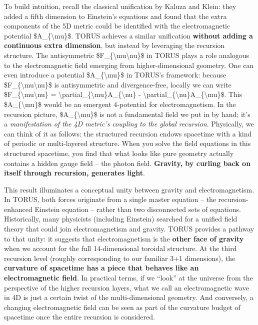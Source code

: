 \documentclass[
]{article}
\begin{document}
{To build intuition, recall the classical unification by Kaluza and
Klein: they added a fifth dimension to Einstein's equations and found
that the extra components of the 5D metric could be identified with the
electromagnetic potential \$A\_\{\textbackslash mu\}\$. TORUS achieves a
similar unification \textbf{without adding a continuous extra
dimension}, but instead by leveraging the recursion structure. The
antisymmetric \$F\_\{\textbackslash mu\textbackslash nu\}\$ in TORUS
plays a role analogous to the electromagnetic field emerging from
higher-dimensional geometry\hspace{0pt}. One can even introduce a
potential \$A\_\{\textbackslash mu\}\$ in TORUS's framework: because
\$F\_\{\textbackslash mu\textbackslash nu\}\$ is antisymmetric and
divergence-free, locally we can write
\$F\_\{\textbackslash mu\textbackslash nu\} =
\textbackslash partial\_\{\textbackslash mu\}A\_\{\textbackslash nu\} -
\textbackslash partial\_\{\textbackslash nu\}A\_\{\textbackslash mu\}\$\hspace{0pt}.
This \$A\_\{\textbackslash mu\}\$ would be an emergent 4-potential for
electromagnetism. In the recursion picture, \$A\_\{\textbackslash mu\}\$
is not a fundamental field we put in by hand; it's a \emph{manifestation
of the 4D metric's coupling to the global recursion}. Physically, we can
think of it as follows: the structured recursion endows spacetime with a
kind of periodic or multi-layered structure. When you solve the field
equations in this structured spacetime, you find that what looks like
pure geometry actually contains a hidden gauge field -- the photon
field. \textbf{Gravity, by curling back on itself through recursion,
generates light}.

This result illuminates a conceptual unity between gravity and
electromagnetism. In TORUS, both forces originate from a single master
equation -- the recursion-enhanced Einstein equation -- rather than two
disconnected sets of equations. Historically, many physicists (including
Einstein) searched for a unified field theory that could join
electromagnetism and gravity. TORUS provides a pathway to that unity: it
suggests that electromagnetism is the \textbf{other face of gravity}
when we account for the full 14-dimensional toroidal structure. At the
third recursion level (roughly corresponding to our familiar 3+1
dimensions), the \textbf{curvature of spacetime has a piece that behaves
like an electromagnetic field}\hspace{0pt}. In practical terms, if we
``look'' at the universe from the perspective of the higher recursion
layers, what we call an electromagnetic wave in 4D is just a certain
twist of the multi-dimensional geometry. And conversely, a changing
electromagnetic field can be seen as part of the curvature budget of
spacetime once the entire recursion is considered.

}
\end{document}
